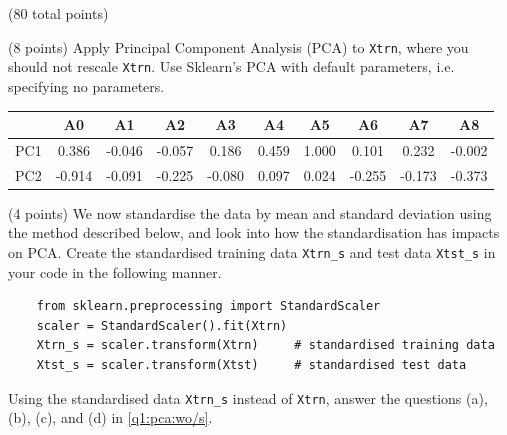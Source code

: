\documentclass[12pt]{article}
\begin{document}
\begin{question}{(80 total points) \qOneTitle}
\begin{subquestion}{(8 points)
    Apply Principal Component Analysis (PCA) to {\tt Xtrn}, where you should not rescale {\tt Xtrn}.
    Use Sklearn's PCA with default parameters, i.e. specifying no parameters.
  }
\begin{answerbox}{0.6\textheight}
\begin{enumerate}
\begin{center}
\begin{tabular}{c|c|c|c|c|c|c|c|c|c}
             &A0&A1&A2&A3&A4&A5&A6&A7&A8 \\ \hline
             PC1&0.386&-0.046&-0.057&0.186&0.459&1.000&0.101&0.232&-0.002 \\ \hline
             PC2&-0.914&-0.091&-0.225&-0.080&0.097&0.024&-0.255&-0.173&-0.373 \\ \hline
        \end{tabular}
    \end{center}
    \end{enumerate}
  \end{answerbox}
    


\end{subquestion}

\begin{subquestion}{(4 points) %
    We now standardise the data by mean and standard deviation using the method described below, and look into how the standardisation has impacts on PCA.
  }\label{q1:pca:w/s}
  Create the standardised training data {\tt Xtrn\_s} and test data {\tt Xtst\_s} in your code in the following manner.
  \begin{lstlisting}
    from sklearn.preprocessing import StandardScaler
    scaler = StandardScaler().fit(Xtrn)
    Xtrn_s = scaler.transform(Xtrn)     # standardised training data
    Xtst_s = scaler.transform(Xtst)     # standardised test data
   \end{lstlisting}
   Using the standardised data {\tt Xtrn\_s} instead of {\tt Xtrn}, 
   answer the questions (a), (b), (c), and (d) in \ref{q1:pca:wo/s}.



\end{subquestion}
\end{question}
\end{document}

